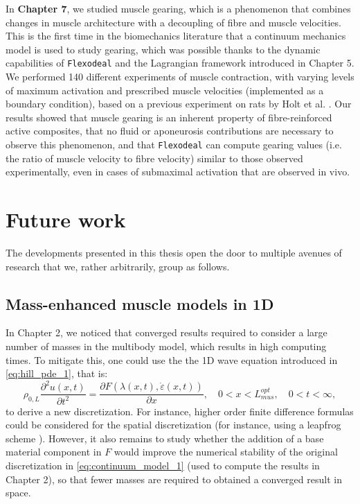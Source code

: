 \documentclass{sfuthesis}
\numberwithin{equation}{section}
\numberwithin{figure}{chapter}
\numberwithin{table}{chapter}
\theoremstyle{definition}
\newcommand{\pder}[2]{\dfrac{\partial #1}{\partial #2}}
\newcommand{\depsilon}{\dot{\varepsilon}}
\begin{document}
In \textbf{Chapter 7}, we studied muscle gearing, which is a phenomenon that combines changes in muscle architecture with a decoupling of fibre and muscle velocities. This is the first time in the biomechanics literature that a continuum mechanics model is used to study gearing, which was possible thanks to the dynamic capabilities of \texttt{Flexodeal} and the Lagrangian framework introduced in Chapter 5. We performed 140 different experiments of muscle contraction, with varying levels of maximum activation and prescribed muscle velocities (implemented as a boundary condition), based on a previous experiment on rats by Holt et al. \cite{Holt2016}.
Our results showed that muscle gearing is an inherent property of fibre-reinforced active composites, that no fluid or aponeurosis contributions are necessary to observe this phenomenon, and that \texttt{Flexodeal} can compute gearing values (i.e. the ratio of muscle velocity to fibre velocity) similar to those observed experimentally, even in cases of submaximal activation that are observed in vivo.

\section{Future work}

The developments presented in this thesis open the door to multiple avenues of research that we, rather arbitrarily, group as follows.

\subsection{Mass-enhanced muscle models in 1D}

In Chapter 2, we noticed that converged results required to consider a large number of masses in the multibody model, which results in high computing times. To mitigate this, one could use the the 1D wave equation introduced in \eqref{eq:hill_pde_1}, that is:
\begin{equation}
    \rho_{0,L} \pder{^2 u(x,t)}{t^2}  = \pder{F(\lambda(x,t),\depsilon(x,t))}{x}, \quad 0 < x < L_{mus}^{opt}, \quad 0 < t < \infty,
\end{equation}
to derive a new discretization. For instance, higher order finite difference formulas could be considered for the spatial discretization (for instance, using a leapfrog scheme \cite{Strikwerda}). However, it also remains to study whether the addition of a base material component in $F$ would improve the numerical stability of the original discretization in \eqref{eq:continuum_model_1} (used to compute the results in Chapter 2), so that fewer masses are required to obtained a converged result in space.
\end{document}
